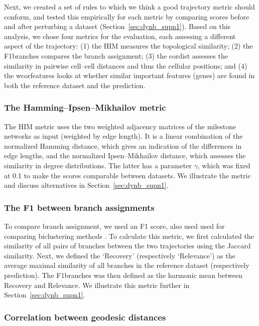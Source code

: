 Next, we created a set of rules to which we think a good trajectory metric should conform, and tested this empirically for each metric by comparing scores before and after perturbing a dataset (Section~\ref{sec:dynb_supn1}). Based on this analysis, we chose four metrics for the evaluation, each assessing a different aspect of the trajectory: (1) the HIM measures the topological similarity; (2) the F1branches compares the branch assignment; (3) the cordist assesses the similarity in pairwise cell–cell distances and thus the cellular positions; and (4) the wcorfeatures looks at whether similar important features (genes) are found in both the reference dataset and the prediction.

\subsubsection{The Hamming–Ipsen–Mikhailov metric}

The HIM metric \cite{jurman_himglocalmetric_2015} uses the two weighted adjacency matrices of the milestone networks as input (weighted by edge length). It is a linear combination of the normalized Hamming distance, which gives an indication of the differences in edge lengths, and the normalized Ipsen–Mikhailov distance, which assesses the similarity in degree distributions. The latter has a parameter $\gamma$, which was fixed at 0.1 to make the scores comparable between datasets. We illustrate the metric and discuss alternatives in Section~\ref{sec:dynb_supn1}.

\subsubsection{The F1 between branch assignments}

To compare branch assignment, we used an F1 score, also used used for comparing biclustering methods \cite{saelens_comprehensiveevaluationmodule_2018}. To calculate this metric, we first calculated the similarity of all pairs of branches between the two trajectories using the Jaccard similarity. Next, we defined the ‘Recovery' (respectively ‘Relevance') as the average maximal similarity of all branches in the reference dataset (respectively prediction). The F1branches was then defined as the harmonic mean between Recovery and Relevance. We illustrate this metric further in Section~\ref{sec:dynb_supn1}.

\subsubsection{Correlation between geodesic distances}

